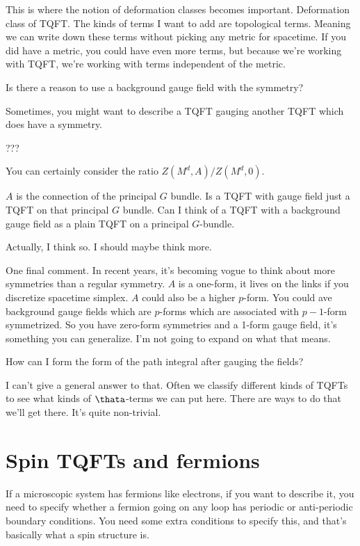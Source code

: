  This is where the notion of deformation classes becomes important.
 Deformation class of TQFT.
 The kinds of terms I want to add are topological terms.
 Meaning we can write down these terms without picking any metric for spacetime.
 If you did have a metric,
 you could have even more terms,
 but because we're working with TQFT,
 we're working with terms independent of the metric.

 \begin{question}
     Is there a reason to use a background gauge field
     with the symmetry?
 \end{question}
 Sometimes, you might want to describe a TQFT gauging another TQFT which does
 have a symmetry.

 \begin{question}
     ???
 \end{question}
 You can certainly consider the ratio
 $Z\left( M^d, A \right)/Z\left( M^d, 0 \right)$.

 \begin{question}
     $A$ is the connection of the principal $G$ bundle.
     Is a TQFT with gauge field just a TQFT on that principal $G$ bundle.
     Can I think of a TQFT with a background gauge field
     as a plain TQFT on a principal $G$-bundle.
 \end{question}
 Actually, I think so.
 I should maybe think more.

 One final comment.
 In recent years, it's becoming vogue to think about more symmetries than a
 regular symmetry.
 $A$ is a one-form,
 it lives on the links if you discretize spacetime simplex.
 $A$ could also be a higher $p$-form.
 You could ave background gauge fields which are $p$-forms
 which are associated with $p-1$-form symmetrized.
 So you have zero-form symmetries and a 1-form gauge field,
 it's something you can generalize.
 I'm not going to expand on what that means.

 \begin{question}
     How can I form the form of the path integral after gauging the fields?
 \end{question}
 I can't give a general answer to that.
 Often we classify different kinds of TQFTs to see what kinds of $\thata$-terms
 we can put here.
 There are ways to do that we'll get there.
 It's quite non-trivial.

 \section{Spin TQFTs and fermions}
 If a microscopic system has fermions like electrons,
 if you want to describe it,
 you need to specify whether a fermion going on any loop has periodic or
 anti-periodic boundary conditions.
 You need some extra conditions to specify this,
 and that's basically what a spin structure is.


